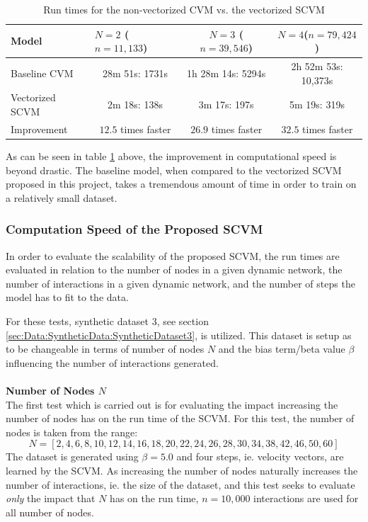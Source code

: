 \begin{table}[H]
\centering
\begin{tabular}{|l|ccc|}
\hline
Model           & \multicolumn{1}{l}{$N = 2$ ($n = 11,133$)} & $N = 3$ ($n = 39,546$)& $N = 4$($n = 79,424$)         \\ \hline
Baseline CVM    & 28m 51s: 1731s            & 1h 28m 14s: 5294s             & 2h 52m 53s: 10,373s    \\
Vectorized SCVM & 2m 18s: 138s              & 3m 17s: 197s  & 5m 19s: 319s    \\ \hline
Improvement & $12.5$ times faster  & $26.9$ times faster  & $32.5$ times faster   \\ \hline
\end{tabular}
\caption{Run times for the non-vectorized CVM vs. the vectorized SCVM}
\label{tab:RuntimeBaseline}
\end{table}
\noindent As can be seen in table \ref{tab:RuntimeBaseline} above, the improvement in computational speed is beyond drastic.
The baseline model, when compared to the vectorized SCVM proposed in this project, takes a tremendous amount of time in order to train on a relatively small dataset.



\subsubsection{Computation Speed of the Proposed SCVM}
\label{sec:ResearchQuestion2:ComputationSpeed}
In order to evaluate the scalability of the proposed SCVM, the run times are evaluated in relation to the number of nodes in a given dynamic network, the number of interactions in a given dynamic network, and the number of steps the model has to fit to the data.

For these tests, synthetic dataset 3, see section \ref{sec:Data:SyntheticData:SyntheticDataset3}, is utilized.
This dataset is setup as to be changeable in terms of number of nodes $N$ and the bias term/beta value $\beta$ influencing the number of interactions generated.
\\\\
\textbf{Number of Nodes $N$}
\\
The first test which is carried out is for evaluating the impact increasing the number of nodes has on the run time of the SCVM.
For this test, the number of nodes is taken from the range:
\begin{equation}
    N = [2, 4, 6, 8, 10, 12, 14, 16, 18, 20, 22, 24, 26, 28, 30, 34, 38, 42, 46, 50, 60]
\end{equation}
The dataset is generated using $\beta = 5.0$ and four steps, ie. velocity vectors, are learned by the SCVM.
As increasing the number of nodes naturally increases the number of interactions, ie. the size of the dataset, and this test seeks to evaluate \textit{only} the impact that $N$ has on the run time, $n = 10,000$ interactions are used for all number of nodes.

